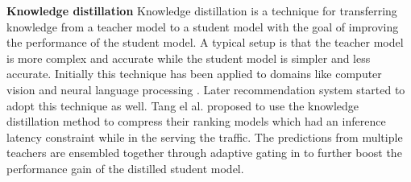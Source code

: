 \noindent \textbf{Knowledge distillation} Knowledge distillation \cite{hinton2015distilling} is a technique for transferring knowledge from a teacher model to a student model with the goal of improving the performance of the student model. A typical setup is that the teacher model is more complex and accurate while the student model is simpler and less accurate. Initially this technique has been applied to domains like computer vision \cite{ba2014l2} \cite{romero2015fitnets} and neural language processing \cite{kim2016sequencelevel}. Later recommendation system started to adopt this technique as well. Tang el al. \cite{rankingdistill} proposed to use the knowledge distillation method to compress their ranking models which had an inference latency constraint while in the serving the traffic. The predictions from multiple teachers are ensembled together through adaptive gating in \cite{ensembledistill} to further boost the performance gain of the distilled student model. 

